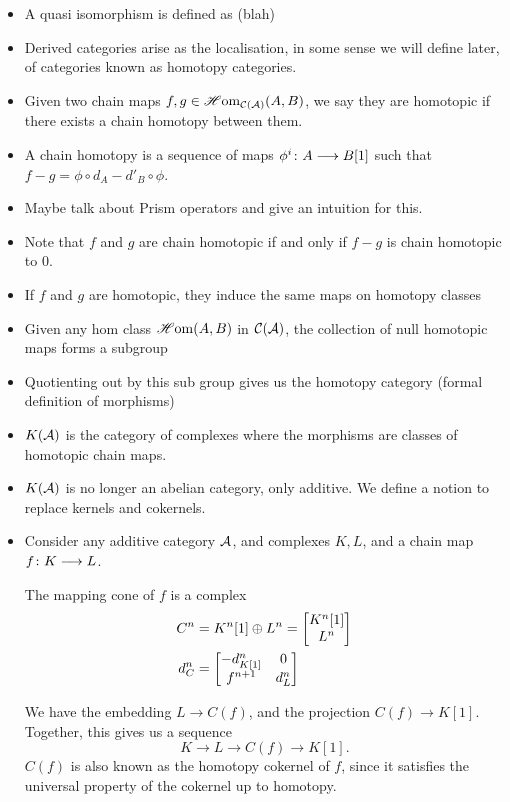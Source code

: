 \documentclass[a4paper]{article}
\begin{document}
\begin{itemize}
    \item A quasi isomorphism is defined as (blah)
    \item Derived categories arise as the localisation, in some sense we will define later, of categories known as homotopy categories.
    \item Given two chain maps $f,g \in \operatorname{\mathscr{H}om}_{\mathcal{C}(\mathcal{A})}(A, B)$, we say they are homotopic if there exists a chain homotopy between them.
    \item A chain homotopy is a sequence of maps $\phi^i\colon A\longrightarrow B[1]$ such that $f-g = \phi \circ d_A - d'_B \circ \phi$.
    \item Maybe talk about Prism operators and give an intuition for this.
    \item Note that $f$ and $g$ are chain homotopic if and only if $f-g$ is chain homotopic to $0$.
    \item If $f$ and $g$ are homotopic, they induce the same maps on homotopy classes
    \item Given any hom class $\operatorname{\mathscr{H}om}(A,B)$ in $\mathcal{C}(\mathcal{A})$, the collection of null homotopic maps forms a subgroup
    \item Quotienting out by this sub group gives us the homotopy category (formal definition of morphisms)
    \item $K(\mathcal{A})$ is the category of complexes where the morphisms are classes of homotopic chain maps.
    \item $K(\mathcal{A})$ is no longer an abelian category, only additive. We define a notion to replace kernels and cokernels.
    \item Consider any additive category $\mathcal{A}$, and complexes $K, L$, and a chain map $f\colon K\longrightarrow L$.
        \begin{Definition}
            The mapping cone of $f$ is a complex
            \begin{align*}
                C^n &= K^n[1] \oplus L^n = \begin{bmatrix}K^n[1]\\ L^n\end{bmatrix} \\
                d^n_C &= \begin{bmatrix} - d^n_{K[1]} & 0 \\ f^{n+1} & d^n_L\end{bmatrix}
            \end{align*}
        \end{Definition}
        We have the embedding $L \to C(f)$, and the projection $C(f) \to K[1]$. Together, this gives us a sequence
        \[
            K \to L \to C(f) \to K[1].
        \]
        $C(f)$ is also known as the homotopy cokernel of $f$, since it satisfies the universal property of the cokernel up to homotopy.

\end{itemize}
\end{document}
